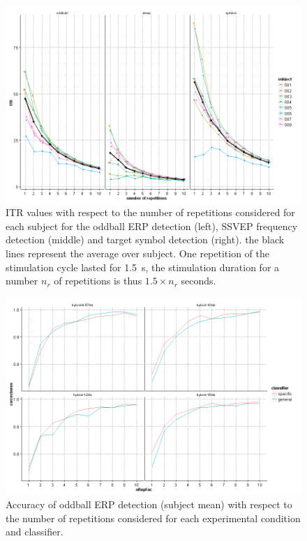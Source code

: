 %
\begin{figure}[t]
\centering
\includegraphics[width=\textwidth]{pix/exp3-ITR}
\caption{
ITR values with respect to the number of repetitions considered for each subject for the oddball ERP detection (left), SSVEP frequency detection (middle) and target symbol detection (right).
the black lines represent the average over subject.
One repetition of the stimulation cycle lasted for \SI{1.5}{\s}, the stimulation duration for a number $n_r$ of repetitions is thus $1.5 \times n_r$ seconds.
}
\label{fig:exp3-ITR}
\end{figure}


%
\begin{figure}[t]
\centering
\includegraphics[width=\textwidth]{pix/P3AccuracyPerClassifierPerFreqSubset}
\caption{
Accuracy of oddball ERP detection (subject mean) with respect to the number of repetitions considered for each experimental condition and classifier.
}
\label{fig:P3AccPerClassifierSubset}
\end{figure}
